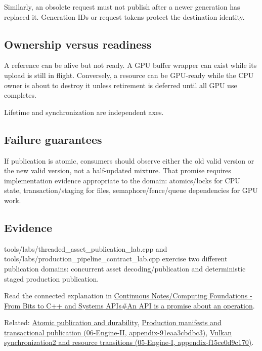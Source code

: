 Similarly, an obsolete request must not publish after a newer generation has replaced it. Generation IDs or request tokens protect the destination identity.

\subsection{Ownership versus readiness}\label{appendix-fdae7ff0a23f-ownership-versus-readiness}

A reference can be alive but not ready. A GPU buffer wrapper can exist while its upload is still in flight. Conversely, a resource can be GPU-ready while the CPU owner is about to destroy it unless retirement is deferred until all GPU use completes.

Lifetime and synchronization are independent axes.

\subsection{Failure guarantees}\label{appendix-fdae7ff0a23f-failure-guarantees}

If publication is atomic, consumers should observe either the old valid version or the new valid version, not a half-updated mixture. That promise requires implementation evidence appropriate to the domain: atomics/locks for CPU state, transaction/staging for files, semaphore/fence/queue dependencies for GPU work.

\subsection{Evidence}\label{appendix-fdae7ff0a23f-evidence}

tools/labs/threaded\_asset\_publication\_lab.cpp and tools/labs/production\_pipeline\_contract\_lab.cpp exercise two different publication domains: concurrent asset decoding/publication and deterministic staged production publication.

Read the connected explanation in \hyperref[01-foundations-i-ch008-an-api-is-a-promise-about-an-operation]{Continuous Notes/Computing Foundations - From Bits to C++ and Systems APIs\#An API is a promise about an operation}.

Related: \hyperref[appendix-e89a8f290ef5]{Atomic publication and durability}, \href{../06-Engine-II/main.pdf\#nameddest=appendix-91eaa3cbdbc3}{Production manifests and transactional publication (06-Engine-II, appendix-91eaa3cbdbc3)}, \href{../05-Engine-I/main.pdf\#nameddest=appendix-f15ce0d9c170}{Vulkan synchronization2 and resource transitions (05-Engine-I, appendix-f15ce0d9c170)}.
